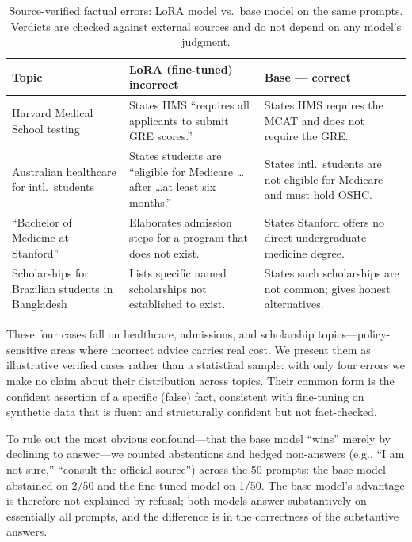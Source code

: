 \documentclass[11pt, a4paper]{article}
\begin{document}
\begin{table}[H]
\centering
\caption{Source-verified factual errors: LoRA model vs.\ base model on the same prompts. Verdicts are checked against external sources and do not depend on any model's judgment.}
\label{tab:factuality}
\begin{tabular}{p{2.2cm}p{4.6cm}p{4.6cm}}
\hline
\textbf{Topic} & \textbf{LoRA (fine-tuned) --- incorrect} & \textbf{Base --- correct} \\
\hline
Harvard Medical School testing & States HMS ``requires all applicants to submit GRE scores.'' & States HMS requires the MCAT and does not require the GRE. \\
Australian healthcare for intl.\ students & States students are ``eligible for Medicare \ldots after \ldots at least six months.'' & States intl.\ students are not eligible for Medicare and must hold OSHC. \\
``Bachelor of Medicine at Stanford'' & Elaborates admission steps for a program that does not exist. & States Stanford offers no direct undergraduate medicine degree. \\
Scholarships for Brazilian students in Bangladesh & Lists specific named scholarships not established to exist. & States such scholarships are not common; gives honest alternatives. \\
\hline
\end{tabular}
\end{table}

These four cases fall on healthcare, admissions, and scholarship topics---policy-sensitive areas where incorrect advice carries real cost. We present them as illustrative verified cases rather than a statistical sample: with only four errors we make no claim about their distribution across topics. Their common form is the confident assertion of a specific (false) fact, consistent with fine-tuning on synthetic data that is fluent and structurally confident but not fact-checked.

To rule out the most obvious confound---that the base model ``wins'' merely by declining to answer---we counted abstentions and hedged non-answers (e.g., ``I am not sure,'' ``consult the official source'') across the 50 prompts: the base model abstained on 2/50 and the fine-tuned model on 1/50. The base model's advantage is therefore not explained by refusal; both models answer substantively on essentially all prompts, and the difference is in the correctness of the substantive answers.
\end{document}
